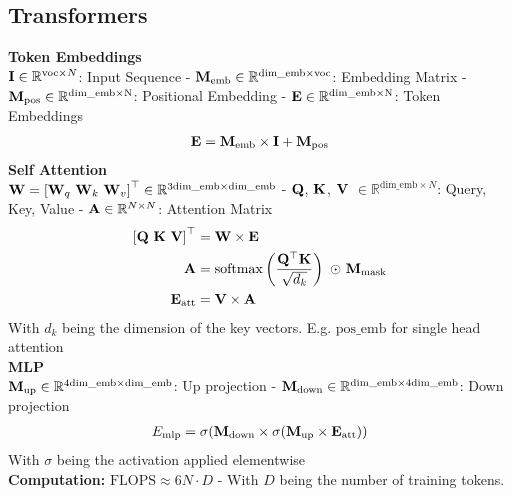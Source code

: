 \begin{multicols}{2}
    \section{Transformers}
    \begin{mdframed}[style=eqbox]
        \textbf{Token Embeddings}\\
        $\mathbf{I} \in \mathbb{R}^{\mathrm{voc}\times N}$: Input Sequence - $\mathbf{M_{\mathrm{emb}}} \in \mathbb{R}^{\mathrm{dim\_emb} \times \mathrm{voc}}$: Embedding Matrix - $\mathbf{M_{\mathrm{pos}}} \in \mathbb{R}^{\mathrm{dim\_emb} \times \mathrm{N}}$: Positional Embedding - $\mathbf{E} \in \mathbb{R}^{\mathrm{dim\_emb} \times \mathrm{N}}$: Token Embeddings
        \begin{align*}
            \mathbf{E} = \mathbf{M}_\mathrm{emb} \times \mathbf{I} + \mathbf{M}_\mathrm{pos}
        \end{align*}
        \textbf{Self Attention}\\
        $\mathbf{W} = \left[ \mathbf{W}_q ~ \mathbf{W}_k ~ \mathbf{W}_v \right]^\top \in \mathbb{R}^{3\mathrm{dim\_emb} \times \mathrm{dim\_emb}}$ - $\mathbf{Q}$, $\mathbf{K}$, $\mathbf{V}$ $\in \mathbb{R}^{\mathrm{dim\_emb} \times N}$: Query, Key, Value - $\mathbf{A} \in \mathbb{R}^{N \times N}$: Attention Matrix
        \begin{align*}
            \left[ \mat{Q} ~ \mat{K} ~ \mat{V} \right]^\top &= \mat{W} \times \mat{E}\\
            \mat{A} &= \operatorname{softmax}\left( \frac{\mat{Q}^\top \mat{K}}{\sqrt{d_k}}\right)~\astrosun~ \mat{M}_\mathrm{mask}\\
            \mat{E}_\mathrm{att} &= \mat{V} \times \mat{A}
        \end{align*}
        {\tiny With $d_k$ being the dimension of the key vectors. E.g. $\mathrm{pos\_emb}$ for single head attention}\\
        \textbf{MLP}\\
        $\mathbf{M}_\mathrm{up} \in \mathbb{R}^{4\mathrm{dim\_emb} \times \mathrm{dim\_emb}}$: Up projection - $\mathbf{M}_\mathrm{down} \in \mathbb{R}^{\mathrm{dim\_emb} \times 4\mathrm{dim\_emb}}$: Down projection
        \begin{align*}
            E_\mathrm{mlp} = \sigma(\mathbf{M}_\mathrm{down} \times \sigma (\mathbf{M}_\mathrm{up} \times \mathbf{E}_\mathrm{att}))
        \end{align*}
        {\tiny With $\sigma$ being the activation applied elementwise}\\
        \textbf{Computation:} $\mathrm{FLOPS} \approx 6N \cdot D$ - With $D$ being the number of training tokens.\\

\end{mdframed}
\end{multicols}
